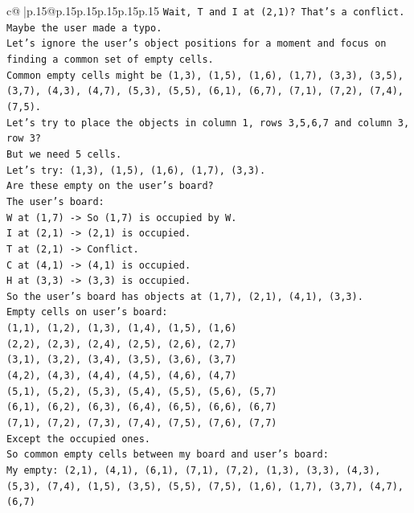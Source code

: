\documentclass{article}
\begin{document}
{\begin{supertabular}{c@{$\;$}|p{.15\linewidth}@{}p{.15\linewidth}p{.15\linewidth}p{.15\linewidth}p{.15\linewidth}p{.15\linewidth}}
{{{\texttt{Wait, T and I at (2,1)? That's a conflict. Maybe the user made a typo.} \\
\texttt{Let's ignore the user's object positions for a moment and focus on finding a common set of empty cells.} \\
\texttt{Common empty cells might be (1,3), (1,5), (1,6), (1,7), (3,3), (3,5), (3,7), (4,3), (4,7), (5,3), (5,5), (6,1), (6,7), (7,1), (7,2), (7,4), (7,5).} \\
\texttt{Let's try to place the objects in column 1, rows 3,5,6,7 and column 3, row 3?} \\
\texttt{But we need 5 cells.} \\
\texttt{Let's try: (1,3), (1,5), (1,6), (1,7), (3,3).} \\
\texttt{Are these empty on the user's board?} \\
\texttt{The user's board:} \\
\texttt{W at (1,7) {-}> So (1,7) is occupied by W.} \\
\texttt{I at (2,1) {-}> (2,1) is occupied.} \\
\texttt{T at (2,1) {-}> Conflict.} \\
\texttt{C at (4,1) {-}> (4,1) is occupied.} \\
\texttt{H at (3,3) {-}> (3,3) is occupied.} \\
\texttt{So the user's board has objects at (1,7), (2,1), (4,1), (3,3).} \\
\texttt{Empty cells on user's board:} \\
\texttt{(1,1), (1,2), (1,3), (1,4), (1,5), (1,6)} \\
\texttt{(2,2), (2,3), (2,4), (2,5), (2,6), (2,7)} \\
\texttt{(3,1), (3,2), (3,4), (3,5), (3,6), (3,7)} \\
\texttt{(4,2), (4,3), (4,4), (4,5), (4,6), (4,7)} \\
\texttt{(5,1), (5,2), (5,3), (5,4), (5,5), (5,6), (5,7)} \\
\texttt{(6,1), (6,2), (6,3), (6,4), (6,5), (6,6), (6,7)} \\
\texttt{(7,1), (7,2), (7,3), (7,4), (7,5), (7,6), (7,7)} \\
\texttt{Except the occupied ones.} \\
\texttt{So common empty cells between my board and user's board:} \\
\texttt{My empty: (2,1), (4,1), (6,1), (7,1), (7,2), (1,3), (3,3), (4,3), (5,3), (7,4), (1,5), (3,5), (5,5), (7,5), (1,6), (1,7), (3,7), (4,7), (6,7)} \\
}}}
\end{supertabular}}
\end{document}
